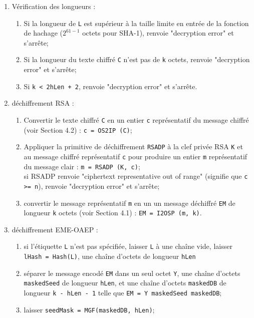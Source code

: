 \begin{enumerate}
	\item Vérification des longueurs :
	\begin{enumerate}
     	\item Si la longueur de \texttt{L} est supérieur à la taille limite en entrée de la fonction de hachage (\texttt{$2^{61 - 1}$} octets pour SHA-1), renvoie "decryption error" et s'arrête;
		\item Si la longueur du texte chiffré \texttt{C} n'est pas de \texttt{k} octets, renvoie "decryption error" et s'arrête;
     \item Si \texttt{k < 2hLen + 2}, renvoie "decryption error" et s'arrête.\\
	\end{enumerate}
	\item déchiffrement RSA :
	\begin{enumerate}
     	\item Convertir le texte chiffré \texttt{C} en un entier \texttt{c} représentatif du message chiffré (voir Section 4.2) : \texttt{c = OS2IP (C)};
     	\item Appliquer la primitive de déchiffrement \texttt{RSADP} à la clef privée RSA \texttt{K} et au message chiffré représentatif \texttt{c} pour produire un entier \texttt{m} représentatif du message clair : \texttt{m = RSADP (K, c)};\\
      	si RSADP renvoie "ciphertext representative out of range" (signifie que \texttt{c >= n}), renvoie "decryption error" et s'arrête;
      	\item convertir le message représentatif \texttt{m} en un un message déchiffré \texttt{EM} de longueur \texttt{k} octets (voir Section 4.1) : \texttt{EM = I2OSP (m, k)}.\\
	\end{enumerate}
	\item déchiffrement EME-OAEP :
	\begin{enumerate}
     	\item si l'étiquette \texttt{L} n'est pas spécifiée, laisser \texttt{L} à une chaîne vide, laisser \texttt{lHash = Hash(L)}, une chaîne d'octets de longueur \texttt{hLen} 
      	\item séparer le message encodé \texttt{EM} dans un seul octet \texttt{Y}, une chaîne d'octets \texttt{maskedSeed} de longueur \texttt{hLen}, et une chaîne d'octets \texttt{maskedDB} de longueur \texttt{k - hLen - 1} telle que \texttt{EM = Y \textbar\textbar maskedSeed \textbar\textbar maskedDB};
      	\item laisser \texttt{seedMask = MGF(maskedDB, hLen)};

\end{enumerate}
\end{enumerate}
